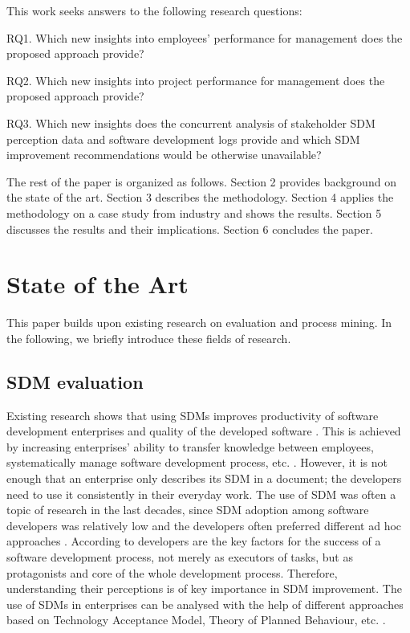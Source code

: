 This work seeks answers to the following research questions:

RQ1. Which new insights into employees’ performance for management does the proposed approach provide?

RQ2. Which new insights into project performance for management does the proposed approach provide?

RQ3. Which new insights does the concurrent analysis of stakeholder SDM perception data and software development logs provide and which SDM improvement recommendations would be otherwise unavailable?


The rest of the paper is organized as follows. Section 2 provides background on the state of the art. Section 3 describes the methodology. Section 4 applies the methodology on a case study from industry and shows the results. Section 5 discusses the results and their implications. Section 6 concludes the paper.

\section{State of the Art}

This paper builds upon existing research on  evaluation and process mining. In the following, we briefly introduce these fields of research. 

\subsection{SDM evaluation}

Existing research shows that using SDMs improves productivity of software development enterprises and quality of the developed software \citep{DBLP:journals/infsof/Bass16,DBLP:journals/re/ZdravkovicSG15,DBLP:journals/access/TuapeHKPK21}. This is achieved by increasing enterprises’ ability to transfer knowledge between employees, systematically manage software development process, etc. \citep{avison2006information,DBLP:journals/iam/Fitzgerald98,hovelja2015exploring,DBLP:journals/tse/RiemenschneiderHD02}. However, it is not enough that an enterprise only describes its SDM in a document; the developers need to use it consistently in their everyday work. The use of SDM was often a topic of research in the last decades, since SDM adoption among software developers was relatively low and the developers often preferred different ad hoc approaches \citep{DBLP:journals/software/Aaen03,DBLP:journals/isj/Fitzgerald96,DBLP:journals/iam/HuismanI06}. According to \cite{DBLP:journals/peerj-cs/DestefanisOCSMT16} developers are the key factors for the success of a software development process, not merely
as executors of tasks, but as protagonists and core of the whole development process. Therefore,
understanding their perceptions is of key importance in SDM improvement.
The use of SDMs in enterprises can be analysed with the help of different approaches based on Technology Acceptance Model, Theory of Planned Behaviour, etc. \citep{aboelmaged2010predicting,venkatesh2000theoretical,DBLP:journals/behaviourIT/WangLH13}. 


